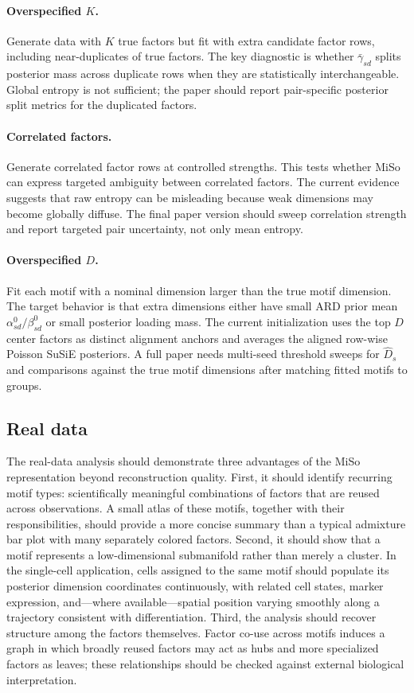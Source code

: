 \documentclass[11pt]{article}
\theoremstyle{plain}
\theoremstyle{definition}
\begin{document}
\paragraph{Overspecified $K$.}
Generate data with $K$ true factors but fit with extra candidate factor rows,
including near-duplicates of true factors. The key diagnostic is whether
$\bar{\gamma}_{sd}$ splits posterior mass across duplicate rows when they are
statistically interchangeable. Global entropy is not sufficient; the paper
should report pair-specific posterior split metrics for the duplicated factors.

\paragraph{Correlated factors.}
Generate correlated factor rows at controlled strengths. This tests whether
MiSo can express targeted ambiguity between correlated factors. The current
evidence suggests that raw entropy can be misleading because weak dimensions may
become globally diffuse. The final paper version should sweep correlation strength and
report targeted pair uncertainty, not only mean entropy.

\paragraph{Overspecified $D$.}
Fit each motif with a nominal dimension larger than the true motif dimension.
The target behavior is that extra dimensions either have small ARD prior mean
$\alpha_{sd}^0/\beta_{sd}^0$ or small posterior loading mass. The current
initialization uses the top $D$ center factors as distinct alignment anchors
and averages the aligned row-wise Poisson SuSiE posteriors. A full paper needs
multi-seed threshold sweeps for $\widehat{D}_s$ and comparisons against the
true motif dimensions after matching fitted motifs to groups.

\subsection{Real data}

The real-data analysis should demonstrate three advantages of the MiSo
representation beyond reconstruction quality. First, it should identify
recurring motif types: scientifically meaningful combinations of factors that
are reused across observations. A small atlas of these motifs, together with
their responsibilities, should provide a more concise summary than a typical
admixture bar plot with many separately colored factors. Second, it should show
that a motif represents a low-dimensional submanifold rather than merely a
cluster. In the single-cell application, cells assigned to the same motif
should populate its posterior dimension coordinates continuously, with related
cell states, marker expression, and---where available---spatial position varying
smoothly along a trajectory consistent with differentiation. Third, the
analysis should recover structure among the factors themselves. Factor co-use
across motifs induces a graph in which broadly reused factors may act as hubs
and more specialized factors as leaves; these relationships should be checked
against external biological interpretation.
\end{document}
